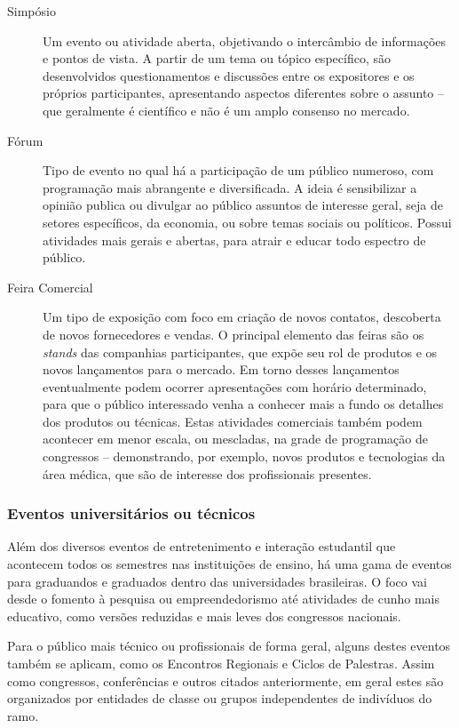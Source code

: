 \documentclass[12pt,a4paper,twoside,hyphens,english,brazil]{abntex2}
\begin{document}
\begin{description}
	\item[Simpósio] Um evento ou atividade aberta, objetivando o intercâmbio de informações e pontos de vista. A partir de um tema ou tópico específico, são desenvolvidos questionamentos e discussões entre os expositores e os próprios participantes, apresentando aspectos diferentes sobre o assunto -- que geralmente é científico e não é um amplo consenso no mercado. %
	
	\item[Fórum] Tipo de evento no qual há a participação de um público numeroso, com programação mais abrangente e diversificada. A ideia é sensibilizar a opinião publica ou divulgar ao público assuntos de interesse geral, seja de setores específicos, da economia, ou sobre temas sociais ou políticos. Possui atividades mais gerais e abertas, para atrair e educar todo espectro de público.
	
	\item[Feira Comercial] Um tipo de exposição com foco em criação de novos contatos, descoberta de novos fornecedores e vendas. O principal elemento das feiras são os \emph{stands} das companhias participantes, que expõe seu rol de produtos e os novos lançamentos para o mercado. Em torno desses lançamentos eventualmente podem ocorrer apresentações com horário determinado, para que o público interessado venha a conhecer mais a fundo os detalhes dos produtos ou técnicas. Estas atividades comerciais também podem acontecer em menor escala, ou mescladas, na grade de programação de congressos -- demonstrando, por exemplo, novos produtos e tecnologias da área médica, que são de interesse dos profissionais presentes.
\end{description}

\subsubsection*{Eventos universitários ou técnicos}

Além dos diversos eventos de entretenimento e interação estudantil que acontecem todos os semestres nas instituições de ensino, há uma gama de eventos para graduandos e graduados dentro das universidades brasileiras. O foco vai desde o fomento à pesquisa ou empreendedorismo até atividades de cunho mais educativo, como versões reduzidas e mais leves dos congressos nacionais.

Para o público mais técnico ou profissionais de forma geral, alguns destes eventos também se aplicam, como os Encontros Regionais e Ciclos de Palestras. Assim como congressos, conferências e outros citados anteriormente, em geral estes são organizados por entidades de classe ou grupos independentes de indivíduos do ramo.
\end{document}
